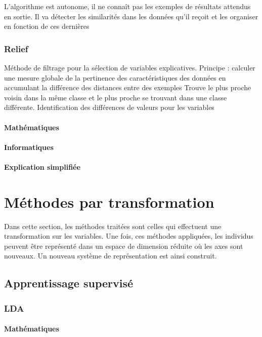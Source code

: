 \documentclass[12pt]{report}
\begin{document}
L’algorithme est autonome, il ne connaît pas les exemples de résultats attendus en sortie. Il va détecter les similarités dans les données qu’il reçoit et les organiser en fonction de ces
dernières

\subsubsection{Relief}

Méthode de filtrage pour la sélection de variables explicatives. Principe : calculer une mesure globale de la pertinence des caractéristiques des données en accumulant la
différence des distances entre des exemples
Trouve le plus proche voisin dans la même classe et le plus proche se trouvant dans une classe différente. Identification des différences de valeurs pour les variables

\paragraph{Mathématiques}
\paragraph{Informatiques}
\paragraph{Explication simplifiée}


\section{Méthodes par transformation}

Dans cette section, les méthodes traitées sont celles qui effectuent une transformation sur les variables. Une fois, ces méthodes appliquées, les individus peuvent être représenté dans un espace de dimension réduite où les axes sont nouveaux. Un nouveau système de représentation est ainsi construit.

\subsection{Apprentissage supervisé}

\subsubsection{LDA}

\paragraph{Mathématiques}
\end{document}
